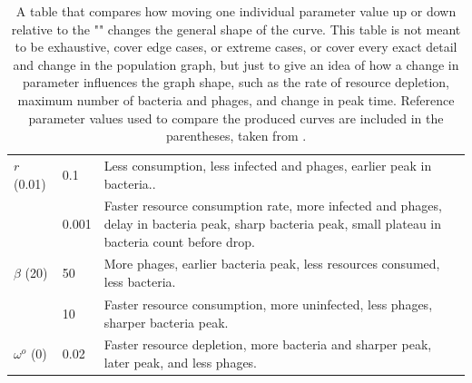 \begin{table}
\begin{tabularx}{\textwidth}{l l X}
        \midrule
        $r$ (0.01) & 0.1 & Less consumption, less infected and phages, earlier peak in bacteria..\\
         & 0.001 & Faster resource consumption rate, more infected and phages, delay in bacteria peak, sharp bacteria peak, small plateau in bacteria count before drop.\\

        \midrule
        $\beta$ (20) & 50 & More phages, earlier bacteria peak, less resources consumed, less bacteria.\\
         & 10 & Faster resource consumption, more uninfected, less phages, sharper bacteria peak.\\

        \midrule
        $\omega^o$ (0) & 0.02 & Faster resource depletion, more bacteria and sharper peak, later peak, and less phages. \\

        \bottomrule
    \end{tabularx}
    \caption{
        A table that compares how moving one individual parameter value up or down relative to the "" changes the general shape of the curve. 
        This table is not meant to be exhaustive, cover edge cases, or extreme cases, or cover every exact detail and change in the population graph, but just to give an idea of how a change in parameter influences the graph shape, such as the rate of resource depletion, maximum number of bacteria and phages, and change in peak time. 
        Reference parameter values used to compare the produced curves are included in the parentheses, taken from . 
    }
    \label{tab:results:graph_behavior}
\end{table}


